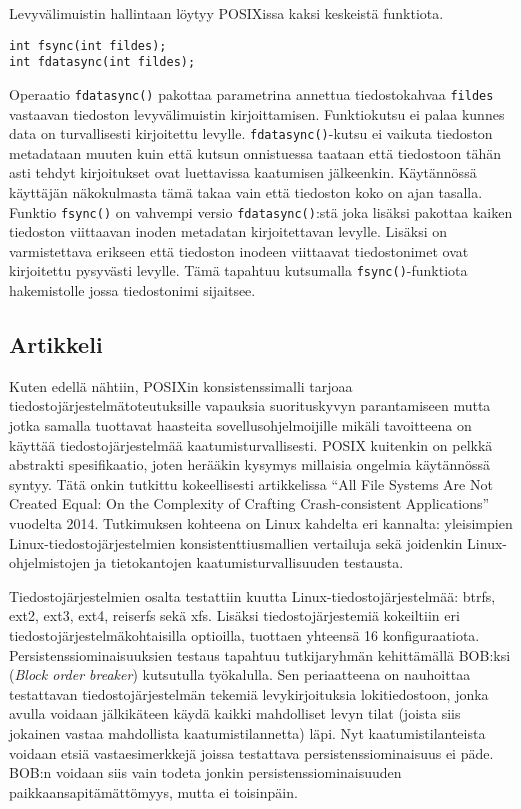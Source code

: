 Levyvälimuistin hallintaan löytyy POSIXissa kaksi keskeistä funktiota.

\begin{verbatim}
int fsync(int fildes);
int fdatasync(int fildes);
\end{verbatim}

Operaatio \texttt{fdatasync()} pakottaa parametrina annettua tiedostokahvaa \texttt{fildes} vastaavan tiedoston levyvälimuistin kirjoittamisen.
Funktiokutsu ei palaa kunnes data on turvallisesti kirjoitettu levylle.
\texttt{fdatasync()}-kutsu ei vaikuta tiedoston metadataan muuten kuin että kutsun onnistuessa taataan että tiedostoon tähän asti tehdyt kirjoitukset ovat luettavissa kaatumisen jälkeenkin.
Käytännössä käyttäjän näkokulmasta tämä takaa vain että tiedoston koko on ajan tasalla.
Funktio \texttt{fsync()} on vahvempi versio \texttt{fdatasync()}:stä joka lisäksi pakottaa kaiken tiedoston viittaavan inoden metadatan kirjoitettavan levylle.
Lisäksi on varmistettava erikseen että tiedoston inodeen viittaavat tiedostonimet ovat kirjoitettu pysyvästi levylle.
Tämä tapahtuu kutsumalla \texttt{fsync()}-funktiota hakemistolle jossa tiedostonimi sijaitsee.

\subsection{Artikkeli}
Kuten edellä nähtiin, POSIXin konsistenssimalli tarjoaa tiedostojärjestelmätoteutuksille vapauksia suorituskyvyn parantamiseen
mutta jotka samalla tuottavat haasteita sovellusohjelmoijille mikäli tavoitteena on käyttää tiedostojärjestelmää kaatumisturvallisesti.
POSIX kuitenkin on pelkkä abstrakti spesifikaatio, joten herääkin kysymys millaisia ongelmia käytännössä syntyy.
Tätä onkin tutkittu kokeellisesti artikkelissa ``All File Systems Are Not Created Equal: On the Complexity of Crafting Crash-consistent Applications''~\cite{PosixDataConsistency} vuodelta 2014.
Tutkimuksen kohteena on Linux kahdelta eri kannalta:
yleisimpien Linux-tiedostojärjestelmien konsistenttiusmallien vertailuja
sekä joidenkin Linux-ohjelmistojen ja tietokantojen kaatumisturvallisuuden testausta.

Tiedostojärjestelmien osalta testattiin kuutta Linux-tiedostojärjestelmää: btrfs, ext2, ext3, ext4, reiserfs sekä xfs.
Lisäksi tiedostojärjestemiä kokeiltiin eri tiedostojärjestelmäkohtaisilla optioilla,
tuottaen yhteensä 16 konfiguraatiota.
Persistenssiominaisuuksien testaus tapahtuu tutkijaryhmän kehittämällä BOB:ksi (\emph{Block order breaker}) kutsutulla työkalulla.
Sen periaatteena on nauhoittaa testattavan tiedostojärjestelmän tekemiä levykirjoituksia lokitiedostoon,
jonka avulla voidaan jälkikäteen käydä kaikki mahdolliset levyn tilat (joista siis jokainen vastaa mahdollista kaatumistilannetta) läpi.
Nyt kaatumistilanteista voidaan etsiä vastaesimerkkejä joissa testattava persistenssiominaisuus ei päde.
BOB:n voidaan siis vain todeta jonkin persistenssiominaisuuden paikkaansapitämättömyys, mutta ei toisinpäin.

